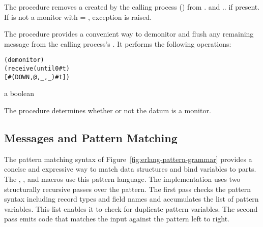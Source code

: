 \begin{procedure}
\end{procedure}
\returns{} 

The  procedure removes a  created by
the calling process () from . and
.. if present.  If
 is not a monitor with  = ,
exception  is raised.

\begin{procedure}
\end{procedure}
\returns{} 

The  procedure provides a convenient way to
demonitor and flush any remaining  message from the
calling process's . It performs the following operations:
\antipar\begin{alltt}
(demonitor )
(receive (until 0 #t)
  [#(DOWN ,@ ,_ ,_) #t])
\end{alltt}

\begin{procedure}
\end{procedure}
\returns{} a boolean

The  procedure determines whether or not the datum
 is a monitor.

\subsection {Messages and Pattern Matching}

The pattern matching syntax of Figure~\ref{fig:erlang-pattern-grammar}
provides a concise and expressive way to match data structures and
bind variables to parts. The , , and
 macros use this pattern language. The
implementation uses two structurally recursive passes over the
pattern. The first pass checks the pattern syntax including record
types and field names and accumulates the list of pattern
variables. This list enables it to check for duplicate pattern
variables.  The second pass emits code that matches the input against
the pattern left to right.

